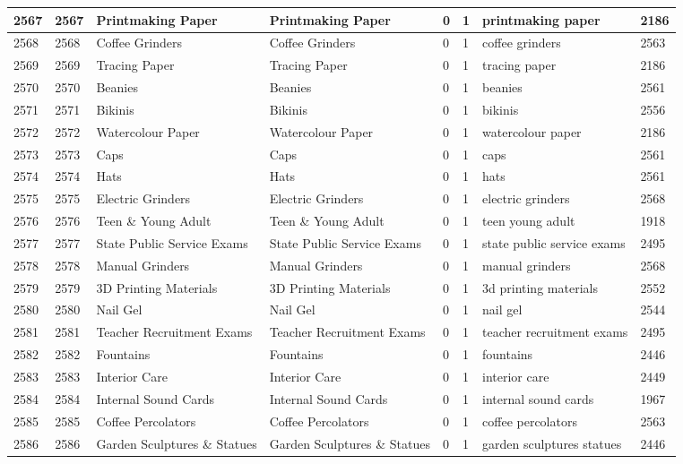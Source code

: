 \begin{longtable}{|l|l|l|l|l|l|l|l|}
2567 & 2567 & Printmaking Paper & Printmaking Paper & 0 & 1 & printmaking paper & 2186 \\ \hline 
2568 & 2568 & Coffee Grinders & Coffee Grinders & 0 & 1 & coffee grinders & 2563 \\ \hline 
2569 & 2569 & Tracing Paper & Tracing Paper & 0 & 1 & tracing paper & 2186 \\ \hline 
2570 & 2570 & Beanies & Beanies & 0 & 1 & beanies & 2561 \\ \hline 
2571 & 2571 & Bikinis & Bikinis & 0 & 1 & bikinis & 2556 \\ \hline 
2572 & 2572 & Watercolour Paper & Watercolour Paper & 0 & 1 & watercolour paper & 2186 \\ \hline 
2573 & 2573 & Caps & Caps & 0 & 1 & caps & 2561 \\ \hline 
2574 & 2574 & Hats & Hats & 0 & 1 & hats & 2561 \\ \hline 
2575 & 2575 & Electric Grinders & Electric Grinders & 0 & 1 & electric grinders & 2568 \\ \hline 
2576 & 2576 & Teen \& Young Adult & Teen \& Young Adult & 0 & 1 & teen young adult & 1918 \\ \hline 
2577 & 2577 & State Public Service Exams & State Public Service Exams & 0 & 1 & state public service exams & 2495 \\ \hline 
2578 & 2578 & Manual Grinders & Manual Grinders & 0 & 1 & manual grinders & 2568 \\ \hline 
2579 & 2579 & 3D Printing Materials & 3D Printing Materials & 0 & 1 & 3d printing materials & 2552 \\ \hline 
2580 & 2580 & Nail Gel & Nail Gel & 0 & 1 & nail gel & 2544 \\ \hline 
2581 & 2581 & Teacher Recruitment Exams & Teacher Recruitment Exams & 0 & 1 & teacher recruitment exams & 2495 \\ \hline 
2582 & 2582 & Fountains & Fountains & 0 & 1 & fountains & 2446 \\ \hline 
2583 & 2583 & Interior Care & Interior Care & 0 & 1 & interior care & 2449 \\ \hline 
2584 & 2584 & Internal Sound Cards & Internal Sound Cards & 0 & 1 & internal sound cards & 1967 \\ \hline 
2585 & 2585 & Coffee Percolators & Coffee Percolators & 0 & 1 & coffee percolators & 2563 \\ \hline 
2586 & 2586 & Garden Sculptures \& Statues & Garden Sculptures \& Statues & 0 & 1 & garden sculptures statues & 2446 \\ \hline 

\end{longtable}
